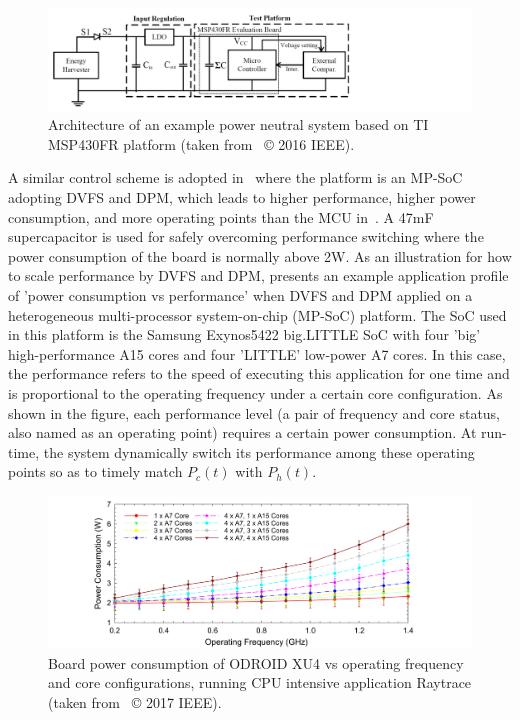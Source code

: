 \begin{figure}
    \centering
    \includegraphics[width=\columnwidth]{ch2_review/figures/graceful_schematic}
    \caption{Architecture of an example power neutral system based on TI MSP430FR platform (taken from \cite{balsamo2016graceful}~© 2016 IEEE).}
    \label{Figure:graceful_schematic}
\end{figure}

A similar control scheme is adopted in~\cite{fletcher2017power} where the platform is an MP-SoC adopting DVFS and DPM, which leads to higher performance, higher power consumption, and more operating points than the MCU in~\cite{balsamo2016graceful}. A 47mF supercapacitor is used for safely overcoming performance switching where the power consumption of the board is normally above 2W. As an illustration for how to scale performance by DVFS and DPM,  presents an example application profile of 'power consumption vs performance' when DVFS and DPM applied on a heterogeneous multi-processor system-on-chip (MP-SoC) platform. The SoC used in this platform is the Samsung Exynos5422 big.LITTLE SoC with four 'big' high-performance A15 cores and four 'LITTLE' low-power A7 cores. In this case, the performance refers to the speed of executing this application for one time and is proportional to the operating frequency under a certain core configuration. As shown in the figure, each performance level (a pair of frequency and core status, also named as an operating point) requires a certain power consumption. At run-time, the system dynamically switch its performance among these operating points so as to timely match $P_c(t)$ with $P_h(t)$.

\begin{figure}
    \centering
    \includegraphics[width=\columnwidth]{ch2_review/figures/dvfs}
    \caption{Board power consumption of ODROID XU4 vs operating frequency and core configurations, running CPU intensive application Raytrace (taken from \cite{fletcher2017power}~© 2017 IEEE).}
    \label{Figure:dvfs}
\end{figure}

